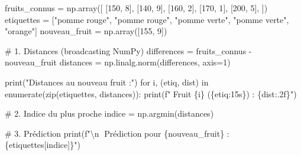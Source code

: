 \documentclass[
  french,
  11pt,
  a4paper,
]{scrbook}
\newenvironment{Shaded}{}{}
\newcommand{\BuiltInTok}[1]{\textcolor[rgb]{0.84,0.23,0.29}{#1}}
\newcommand{\CharTok}[1]{\textcolor[rgb]{0.01,0.18,0.38}{#1}}
\newcommand{\CommentTok}[1]{\textcolor[rgb]{0.42,0.45,0.49}{#1}}
\newcommand{\ControlFlowTok}[1]{\textcolor[rgb]{0.84,0.23,0.29}{#1}}
\newcommand{\DecValTok}[1]{\textcolor[rgb]{0.00,0.36,0.77}{#1}}
\newcommand{\KeywordTok}[1]{\textcolor[rgb]{0.84,0.23,0.29}{#1}}
\newcommand{\NormalTok}[1]{\textcolor[rgb]{0.14,0.16,0.18}{#1}}
\newcommand{\OperatorTok}[1]{\textcolor[rgb]{0.14,0.16,0.18}{#1}}
\newcommand{\SpecialCharTok}[1]{\textcolor[rgb]{0.00,0.36,0.77}{#1}}
\newcommand{\SpecialStringTok}[1]{\textcolor[rgb]{0.01,0.18,0.38}{#1}}
\newcommand{\StringTok}[1]{\textcolor[rgb]{0.01,0.18,0.38}{#1}}
\begin{document}
\begin{tcolorbox}[enhanced jigsaw, arc=.35mm, bottomrule=.15mm, bottomtitle=1mm, breakable, colback=white, colbacktitle=quarto-callout-tip-color!10!white, colframe=quarto-callout-tip-color-frame, coltitle=black, left=2mm, leftrule=.75mm, opacityback=0, opacitybacktitle=0.6, rightrule=.15mm, title=\textcolor{quarto-callout-tip-color}{\faLightbulb}\hspace{0.5em}{✅ Voir la correction}, titlerule=0mm, toprule=.15mm, toptitle=1mm]

\begin{Shaded}
\begin{Highlighting}[]
\NormalTok{fruits\_connus }\OperatorTok{=}\NormalTok{ np.array([}
\NormalTok{    [}\DecValTok{150}\NormalTok{, }\DecValTok{8}\NormalTok{], [}\DecValTok{140}\NormalTok{, }\DecValTok{9}\NormalTok{], [}\DecValTok{160}\NormalTok{, }\DecValTok{2}\NormalTok{], [}\DecValTok{170}\NormalTok{, }\DecValTok{1}\NormalTok{], [}\DecValTok{200}\NormalTok{, }\DecValTok{5}\NormalTok{],}
\NormalTok{])}
\NormalTok{etiquettes }\OperatorTok{=}\NormalTok{ [}\StringTok{"pomme rouge"}\NormalTok{, }\StringTok{"pomme rouge"}\NormalTok{, }\StringTok{"pomme verte"}\NormalTok{, }
              \StringTok{"pomme verte"}\NormalTok{, }\StringTok{"orange"}\NormalTok{]}
\NormalTok{nouveau\_fruit }\OperatorTok{=}\NormalTok{ np.array([}\DecValTok{155}\NormalTok{, }\DecValTok{9}\NormalTok{])}

\CommentTok{\# 1. Distances (broadcasting NumPy)}
\NormalTok{differences }\OperatorTok{=}\NormalTok{ fruits\_connus }\OperatorTok{{-}}\NormalTok{ nouveau\_fruit}
\NormalTok{distances }\OperatorTok{=}\NormalTok{ np.linalg.norm(differences, axis}\OperatorTok{=}\DecValTok{1}\NormalTok{)}

\BuiltInTok{print}\NormalTok{(}\StringTok{"Distances au nouveau fruit :"}\NormalTok{)}
\ControlFlowTok{for}\NormalTok{ i, (etiq, dist) }\KeywordTok{in} \BuiltInTok{enumerate}\NormalTok{(}\BuiltInTok{zip}\NormalTok{(etiquettes, distances)):}
    \BuiltInTok{print}\NormalTok{(}\SpecialStringTok{f"  Fruit }\SpecialCharTok{\{}\NormalTok{i}\SpecialCharTok{\}}\SpecialStringTok{ (}\SpecialCharTok{\{}\NormalTok{etiq}\SpecialCharTok{:15s\}}\SpecialStringTok{) : }\SpecialCharTok{\{}\NormalTok{dist}\SpecialCharTok{:.2f\}}\SpecialStringTok{"}\NormalTok{)}

\CommentTok{\# 2. Indice du plus proche}
\NormalTok{indice }\OperatorTok{=}\NormalTok{ np.argmin(distances)}

\CommentTok{\# 3. Prédiction}
\BuiltInTok{print}\NormalTok{(}\SpecialStringTok{f"}\CharTok{\textbackslash{}n}\SpecialStringTok{🎯 Prédiction pour }\SpecialCharTok{\{}\NormalTok{nouveau\_fruit}\SpecialCharTok{\}}\SpecialStringTok{ : }\SpecialCharTok{\{}\NormalTok{etiquettes[indice]}\SpecialCharTok{\}}\SpecialStringTok{"}\NormalTok{)}
\end{Highlighting}
\end{Shaded}


\end{tcolorbox}
\end{document}
